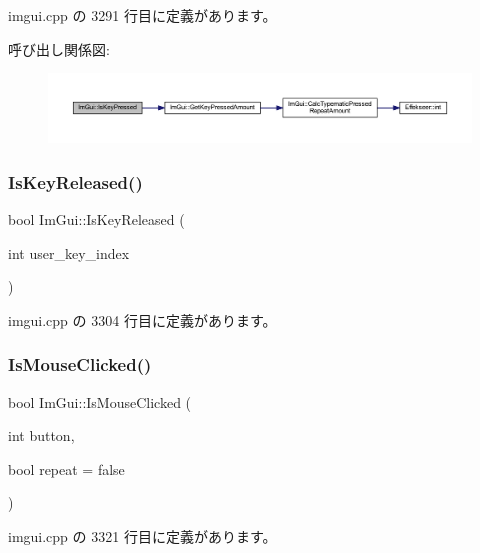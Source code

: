  imgui.\+cpp の 3291 行目に定義があります。

呼び出し関係図\+:\nopagebreak
\begin{figure}[H]
\begin{center}
\leavevmode
\includegraphics[width=350pt]{namespace_im_gui_a83331a8afa5316bc98ed9c98b151ac01_cgraph}
\end{center}
\end{figure}
\mbox{\label{namespace_im_gui_a3fb25247181c5c292fe4f932bd20de88}} 
\subsubsection{\texorpdfstring{Is\+Key\+Released()}{IsKeyReleased()}}
{\footnotesize\ttfamily bool Im\+Gui\+::\+Is\+Key\+Released (\begin{DoxyParamCaption}\item[{int}]{user\+\_\+key\+\_\+index }\end{DoxyParamCaption})}



 imgui.\+cpp の 3304 行目に定義があります。

\mbox{\label{namespace_im_gui_a22b689cf4cf519590c2e2ad4f5462f29}} 
\subsubsection{\texorpdfstring{Is\+Mouse\+Clicked()}{IsMouseClicked()}}
{\footnotesize\ttfamily bool Im\+Gui\+::\+Is\+Mouse\+Clicked (\begin{DoxyParamCaption}\item[{int}]{button,  }\item[{bool}]{repeat = {\ttfamily false} }\end{DoxyParamCaption})}



 imgui.\+cpp の 3321 行目に定義があります。

